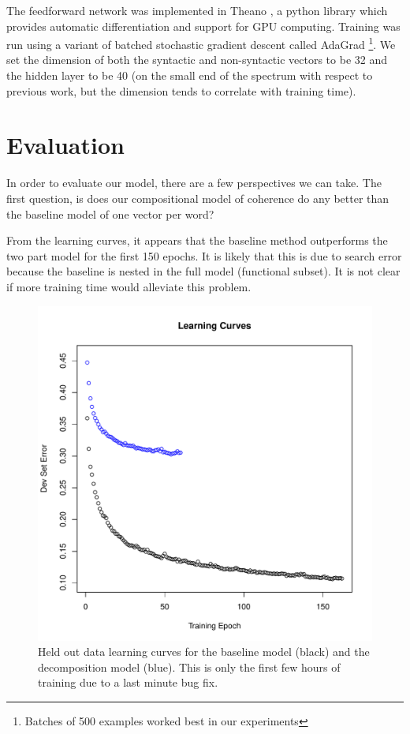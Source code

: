 \documentclass[11pt,letterpaper]{article}
\begin{document}
The feedforward network was implemented in Theano \cite{theano},
a python library which provides automatic differentiation and support for GPU computing.
Training was run using a variant of batched stochastic gradient descent called AdaGrad \cite{adagrad}
\footnote{Batches of 500 examples worked best in our experiments}.
We set the dimension of both the syntactic and non-syntactic vectors to be 32
and the hidden layer to be 40
(on the small end of the spectrum with respect to previous work,
but the dimension tends to correlate with training time).









\section{Evaluation} %
In order to evaluate our model, there are a few perspectives we can take.
The first question, is does our compositional model of coherence do any better
than the baseline model of one vector per word?

From the learning curves, it appears that the baseline method outperforms
the two part model for the first 150 epochs. It is likely that this is due
to search error because the baseline is nested in the full model (functional subset).
It is not clear if more training time would alleviate this problem.
\begin{figure}[ht]
\includegraphics[width=\linewidth]{learningCurve.pdf}
\caption{Held out data learning curves for the baseline model (black) and the
decomposition model (blue). This is only the first few hours of training
due to a last minute bug fix.}
\end{figure}
\end{document}

